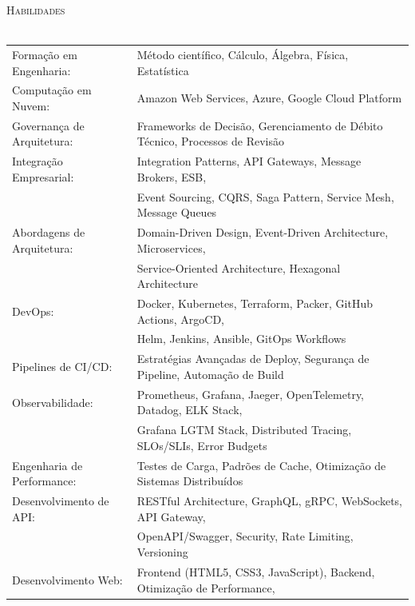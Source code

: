 \documentclass[a4paper]{article}
\newcommand{\lineunder} {
    \vspace*{-8pt} \\
    \hspace*{-18pt} \hrulefill \\
}
\newcommand{\header} [1] {
    {\hspace*{-18pt}\vspace*{6pt} \textsc{#1}}
    \vspace*{-6pt} \lineunder
}
\begin{document}
\header{Habilidades}
\vspace{2mm}
\begin{tabular}{ @{}l l }
	Formação em Engenharia:             & Método científico, Cálculo, Álgebra, Física, Estatística        \\[0.5ex]
	Computação em Nuvem:                 & Amazon Web Services, Azure, Google Cloud Platform                \\[0.5ex]
	Governança de Arquitetura:         & Frameworks de Decisão, Gerenciamento de Débito 
Técnico, Processos de Revisão \\[0.5ex]
	Integração Empresarial:             & Integration Patterns, API Gateways, Message Brokers, ESB,        \\
                                        & Event Sourcing, CQRS, Saga Pattern, Service Mesh, Message Queues \\[0.5ex]
  Abordagens de Arquitetura:           
 & Domain-Driven Design, Event-Driven Architecture, Microservices,  \\
                                        & Service-Oriented Architecture, Hexagonal Architecture            \\[0.5ex]
	DevOps:                              & Docker, Kubernetes, Terraform, 
Packer, GitHub Actions, ArgoCD,     \\
	                                     & Helm, Jenkins, Ansible, GitOps Workflows                         \\[0.5ex]
	Pipelines de CI/CD:                 & 
Estratégias Avançadas de Deploy, Segurança de Pipeline, Automação de Build \\[0.5ex]
	Observabilidade:                     & Prometheus, Grafana, Jaeger, OpenTelemetry, Datadog, ELK Stack,   \\
	                                     & Grafana LGTM Stack, Distributed Tracing, SLOs/SLIs, Error Budgets \\[0.5ex]
	Engenharia de Performance:          
  & Testes de Carga, Padrões de Cache, Otimização de Sistemas Distribuídos \\[0.5ex]
	Desenvolvimento de API:             & RESTful Architecture, GraphQL, gRPC, WebSockets, API Gateway,     \\
	                                     & OpenAPI/Swagger, Security, Rate Limiting, Versioning           
\\[0.5ex]
	Desenvolvimento Web:                 & Frontend (HTML5, CSS3, JavaScript), Backend, Otimização de Performance, \\

\end{tabular}
\end{document}
